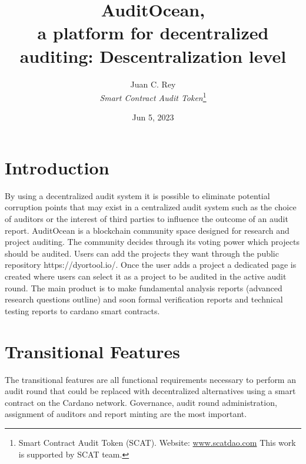 \documentclass[9pt]{article}
\begin{document}
\title{\textbf{AuditOcean,\\a platform for decentralized auditing: Descentralization level }}
\author{Juan C. Rey\\ \emph{Smart Contract Audit Token}\footnote{Smart Contract Audit Token (SCAT). Website: \url{www.scatdao.com} This work is supported by SCAT team.}\\}
\date{Jun 5, 2023}

\maketitle

\renewcommand*\abstractname{\textbf{}\hfill}


\section{Introduction}
By using a decentralized audit system it is possible to eliminate potential corruption points that may exist in a centralized audit system such as the choice of auditors or the interest of third parties to influence the outcome of an audit report. AuditOcean is a blockchain community space designed for research and project auditing. The community decides through its voting power which projects should be audited. Users can add the projects they want through the public repository https://dyortool.io/. Once the user adds a project a dedicated page is created where users can select it as a project to be audited in the active audit round. The main product is to make fundamental analysis reports (advanced research questions outline) and soon formal verification reports and technical testing reports to cardano smart contracts.

\section{ Transitional Features }
The transitional features are all functional requirements necessary to perform an audit round that could be replaced with decentralized alternatives using a smart contract on the Cardano network. Governance, audit round administration, assignment of auditors and report minting are the most important. 
\end{document}

